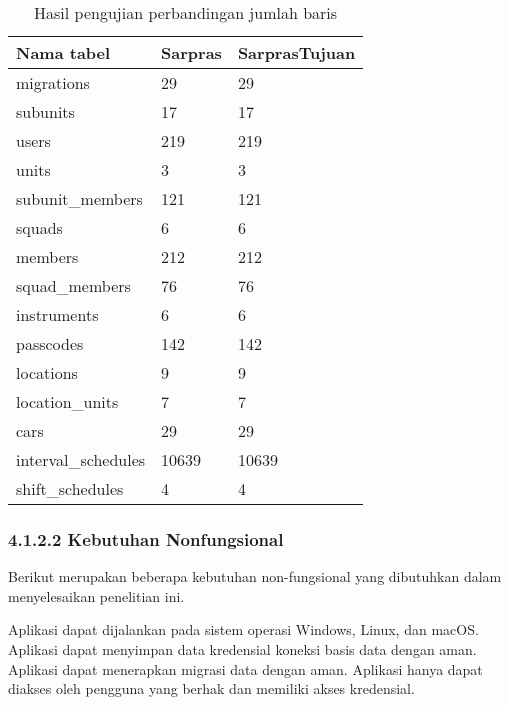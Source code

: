 \begin{table}
  \caption{Hasil pengujian perbandingan jumlah baris}
  \label{tab:baris}
  \centering
  \begin{tabular}{lll}
    \toprule
    \textbf{Nama tabel} & \textbf{Sarpras} & \textbf{SarprasTujuan} \\
    \midrule
    migrations & 29 & 29 \\
    
    subunits & 17 & 17 \\
    
    users & 219 & 219 \\
    
    units & 3 & 3 \\
    
    subunit\_members & 121 & 121 \\
    
    squads & 6 & 6 \\
    
    members & 212 & 212 \\
    
    squad\_members & 76 & 76 \\
    
    instruments & 6 & 6 \\
    
    passcodes & 142 & 142 \\
    
    locations & 9 & 9 \\
    
    location\_units & 7 & 7 \\
    
    cars & 29 & 29 \\
    
    interval\_schedules & 10639 & 10639 \\
    
    shift\_schedules & 4 & 4 \\
    \bottomrule
  \end{tabular}
  \end{table}



\subsubsection{4.1.2.2 Kebutuhan Nonfungsional}
Berikut merupakan beberapa kebutuhan non-fungsional yang dibutuhkan dalam menyelesaikan penelitian ini.

Aplikasi dapat dijalankan pada sistem operasi Windows, Linux, dan macOS. Aplikasi dapat menyimpan data kredensial koneksi basis data dengan aman. Aplikasi dapat menerapkan migrasi data dengan aman. Aplikasi hanya dapat diakses oleh pengguna yang berhak dan memiliki akses kredensial.
